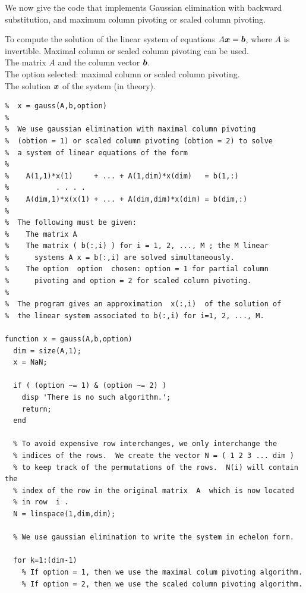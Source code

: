 We now give the code that implements Gaussian elimination with backward
substitution, and maximum column pivoting or scaled column pivoting.

\begin{code}
To compute the solution of the linear system of equations
$A\bm{x} = \bm{b}$, where $A$ is invertible.  Maximal column or
scaled column pivoting can be used.\\
 The matrix $A$ and the column vector $\bm{b}$.\\
The option selected: maximal column or scaled column
pivoting.\\
 The solution $\bm{x}$ of the system (in theory).
\small
\begin{verbatim}
%  x = gauss(A,b,option)
%
%  We use gaussian elimination with maximal column pivoting
%  (obtion = 1) or scaled column pivoting (obtion = 2) to solve
%  a system of linear equations of the form
%
%    A(1,1)*x(1)     + ... + A(1,dim)*x(dim)   = b(1,:)
%           . . . .
%    A(dim,1)*x(x(1) + ... + A(dim,dim)*x(dim) = b(dim,:)
%
%  The following must be given:
%    The matrix A
%    The matrix ( b(:,i) ) for i = 1, 2, ..., M ; the M linear
%      systems A x = b(:,i) are solved simultaneously.
%    The option  option  chosen: option = 1 for partial column
%      pivoting and option = 2 for scaled column pivoting.
%
%  The program gives an approximation  x(:,i)  of the solution of
%  the linear system associated to b(:,i) for i=1, 2, ..., M.

function x = gauss(A,b,option)
  dim = size(A,1);
  x = NaN;

  if ( (option ~= 1) & (option ~= 2) )
    disp 'There is no such algorithm.';
    return;
  end

  % To avoid expensive row interchanges, we only interchange the
  % indices of the rows.  We create the vector N = ( 1 2 3 ... dim )
  % to keep track of the permutations of the rows.  N(i) will contain the
  % index of the row in the original matrix  A  which is now located
  % in row  i .
  N = linspace(1,dim,dim);

  % We use gaussian elimination to write the system in echelon form.

  for k=1:(dim-1)
    % If option = 1, then we use the maximal colum pivoting algorithm.
    % If option = 2, then we use the scaled column pivoting algorithm.


\end{verbatim}
\end{code}
